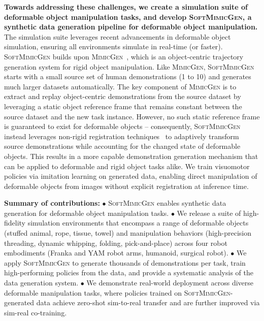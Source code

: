 \documentclass[letterpaper, 10 pt, conference]{ieeeconf}  %
\newcommand{\sysName}{\textsc{SoftMimicGen}\xspace}
\newcommand{\MimicGen}{\textsc{MimicGen}\xspace}
\begin{document}
\textbf{Towards addressing these challenges, we create a simulation suite of deformable object manipulation tasks, and develop \sysName, a synthetic data generation pipeline for deformable object manipulation.} The simulation suite leverages recent advancements in deformable object simulation, ensuring all environments simulate in real-time (or faster). \sysName builds upon \MimicGen~\cite{mandlekar2023mimicgen}, which is an object-centric trajectory generation system for rigid object manipulation. Like \MimicGen, \sysName starts with a small source set of human demonstrations (1 to 10) and generates much larger datasets automatically. The key component of \MimicGen is to extract and replay object-centric demonstrations from the source dataset by leveraging a static object reference frame that remains constant between the source dataset and the new task instance. However, no such static reference frame is guaranteed to exist for deformable objects -- consequently, \sysName instead leverages non-rigid registration techniques~\cite{schulman2016learning, schulman2013case} to adaptively transform source demonstrations while accounting for the changed state of deformable objects. This results in a more capable demonstration generation mechanism that can be applied to deformable and rigid object tasks alike. We train visuomotor policies via imitation learning on generated data, enabling direct manipulation of deformable objects from images without explicit registration at inference time.


\noindent \textbf{Summary of contributions:}
\newline\noindent $\bullet$ \sysName enables synthetic data generation for deformable object manipulation tasks.
\newline\noindent $\bullet$ We release a suite of high-fidelity simulation environments that encompass a range of deformable objects (stuffed animal, rope, tissue, towel) and manipulation behaviors (high-precision threading, dynamic whipping, folding, pick-and-place) across four robot embodiments (Franka and YAM robot arms, humanoid, surgical robot).
\newline\noindent $\bullet$ We apply \sysName to generate thousands of demonstrations per task, train high-performing policies from the data, and provide a systematic analysis of the data generation system.
\newline\noindent $\bullet$ We demonstrate real-world deployment across diverse deformable manipulation tasks, where policies trained on \sysName-generated data achieve zero-shot sim-to-real transfer and are further improved via sim-real co-training.
\end{document}
